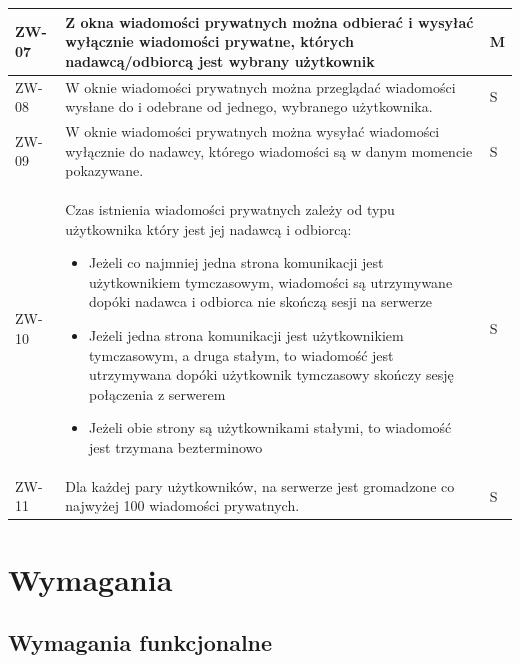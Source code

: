 \begin{tabular}{ | l | l | l | }
    \hline
    ZW-07 & \parbox[t]{14cm}{
      Z okna wiadomości prywatnych można odbierać i wysyłać wyłącznie
      wiadomości prywatne, których nadawcą/odbiorcą jest wybrany
      użytkownik
    } & M \\    
    
    \hline
    ZW-08 & \parbox[t]{14cm}{
      W oknie wiadomości prywatnych można przeglądać wiadomości wysłane do i odebrane od jednego, wybranego użytkownika.
      
    } & S \\
    
    \hline
    ZW-09 & \parbox[t]{14cm}{
      W oknie wiadomości prywatnych można wysyłać wiadomości
      wyłącznie do nadawcy, którego wiadomości są w danym momencie
      pokazywane.
    } & S \\
    
    \hline
    ZW-10 & \parbox[t]{14cm}{
      Czas istnienia wiadomości prywatnych zależy od typu użytkownika
      który jest jej nadawcą i odbiorcą:
      \begin{itemize}
      	\item Jeżeli co najmniej jedna strona komunikacji
      	 jest użytkownikiem tymczasowym, wiadomości są
      	 utrzymywane dopóki nadawca i odbiorca nie skończą
      	 sesji na serwerze
      	\item Jeżeli jedna strona komunikacji jest
      	użytkownikiem
      	tymczasowym, a druga stałym, to wiadomość jest utrzymywana
      	dopóki użytkownik tymczasowy skończy sesję połączenia z
      	serwerem
      	\item Jeżeli obie strony są użytkownikami stałymi, to
      	wiadomość jest trzymana bezterminowo
      \end{itemize}
    } & S \\
    
    \hline
    ZW-11 & \parbox[t]{14cm}{
      Dla każdej pary użytkowników, na serwerze jest
      gromadzone co najwyżej 100 wiadomości prywatnych.
    } & S \\
    \hline
  \end{tabular}

\section{Wymagania}

\subsection{Wymagania funkcjonalne}

